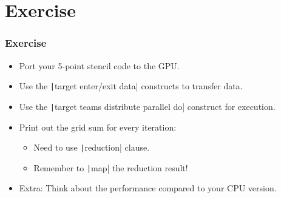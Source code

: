 \documentclass{beamer}
\begin{document}
\section{Exercise}
\begin{frame}
\frametitle{Exercise}
\begin{itemize}
  \item Port your 5-point stencil code to the GPU.
  \item Use the \texttt|target enter/exit data| constructs to transfer data.
  \item Use the \texttt|target teams distribute parallel do| construct for execution.
  \item Print out the grid sum for every iteration:
    \begin{itemize}
      \item Need to use \texttt|reduction| clause.
      \item Remember to \texttt|map| the reduction result!
    \end{itemize}
  \item Extra: Think about the performance compared to your CPU version.
\end{itemize}
\end{frame}
\end{document}
